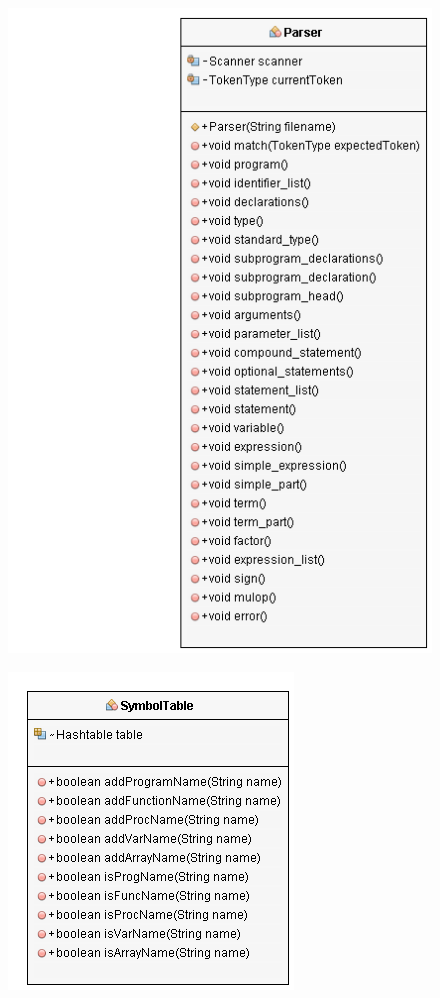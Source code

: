 \documentclass[10]{article}
\begin{document}
\begin{appendices}
\begin{figure}
	\includegraphics{ParserUML.png}
\end{figure}
\begin{figure}
	\includegraphics{SymTableUML.png}
\end{figure}
\end{appendices}
\end{document}
